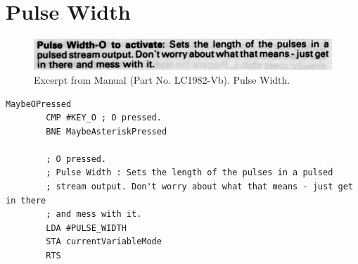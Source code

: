 \chapter{Pulse Width} 
\lstset{style=6502Style}

\begin{figure}[H]
    \centering
    \begin{adjustbox}{width=10.5cm,margin=0cm}
      \includegraphics[width=12cm]{src/pulsewidth/pulsewidth.png}%
    \end{adjustbox}
    \caption{
      Excerpt from Manual (Part No. LC1982-Vb). Pulse Width.
      }
\end{figure}

\begin{lstlisting}[caption=From \icode{CheckKeyboardInput}.]
MaybeOPressed   
        CMP #KEY_O ; O pressed.
        BNE MaybeAsteriskPressed

        ; O pressed.
        ; Pulse Width : Sets the length of the pulses in a pulsed
        ; stream output. Don't worry about what that means - just get in there
        ; and mess with it.
        LDA #PULSE_WIDTH
        STA currentVariableMode
        RTS 
\end{lstlisting}


